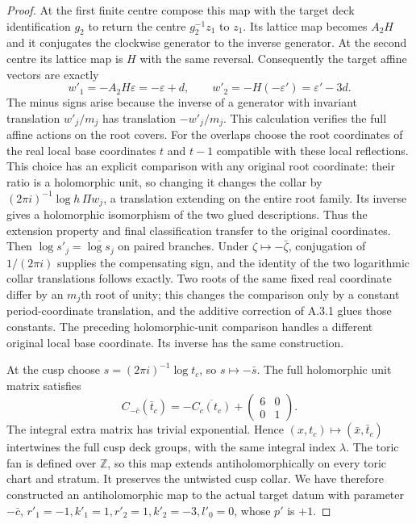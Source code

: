 \begin{proof}
At the first finite centre compose this map with the target deck identification $g_2$ to return the centre $g_2^{-1}z_1$ to $z_1$. Its lattice map becomes $A_2H$ and it conjugates the clockwise generator to the inverse generator. At the second centre its lattice map is $H$ with the same reversal. Consequently the target affine vectors are exactly
\[
 w'_1=-A_2H\varepsilon=-\varepsilon+d,\qquad
 w'_2=-H(-\varepsilon')=\varepsilon'-3d.
\]
The minus signs arise because the inverse of a generator with invariant translation $w'_j/m_j$ has translation $-w'_j/m_j$. This calculation verifies the full affine actions on the root covers. For the overlaps choose the root coordinates of the real local base coordinates $t$ and $t-1$ compatible with these local reflections. This choice has an explicit comparison with any original root coordinate: their ratio is a holomorphic unit, so changing it changes the collar by $(2\pi i)^{-1}\log h\,\Pi w_j$, a translation extending on the entire root family. Its inverse gives a holomorphic isomorphism of the two glued descriptions. Thus the extension property and final classification transfer to the original coordinates. Then $\log s'_j=\overline{\log s_j}$ on paired branches. Under $\zeta\mapsto-\bar\zeta$, conjugation of $1/(2\pi i)$ supplies the compensating sign, and the identity of the two logarithmic collar translations follows exactly. Two roots of the same fixed real coordinate differ by an $m_j$th root of unity; this changes the comparison only by a constant period-coordinate translation, and the additive correction of A.3.1 glues those constants. The preceding holomorphic-unit comparison handles a different original local base coordinate. Its inverse has the same construction.

At the cusp choose $s=(2\pi i)^{-1}\log t_c$, so $s\mapsto-\bar s$. The full holomorphic unit matrix satisfies
\[
 C_{-\bar c}(\bar t_c)=-\overline{C_c(t_c)}+
       \begin{pmatrix}6&0\\0&1\end{pmatrix}.
\]
The integral extra matrix has trivial exponential. Hence $(x,t_c)\mapsto(\bar x,\bar t_c)$ intertwines the full cusp deck groups, with the same integral index $\lambda$. The toric fan is defined over $\mathbb Z$, so this map extends antiholomorphically on every toric chart and stratum. It preserves the untwisted cusp collar. We have therefore constructed an antiholomorphic map to the actual target datum with parameter $-\bar c$, $r'_1=-1,k'_1=1,r'_2=1,k'_2=-3,l'_0=0$, whose $p'$ is $+1$.


\end{proof}
